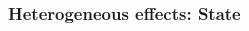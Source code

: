\documentclass{beamer}
\begin{document}
\begin{frame}
\frametitle{Heterogeneous effects: State}
\begin{columns}[T] %
\begin{column}{.48\textwidth}
\scalebox{.6}{
\vbox{%
\vspace{-10pt}
\begin{table}

\end{table}}}
\end{column}%
\hfill%
\begin{column}{.48\textwidth}
\scalebox{.6}{
\vbox{%
\vspace{-10pt}
\begin{table}

\end{table}}}
\end{column}%
\end{columns}
\end{frame}
\end{document}
